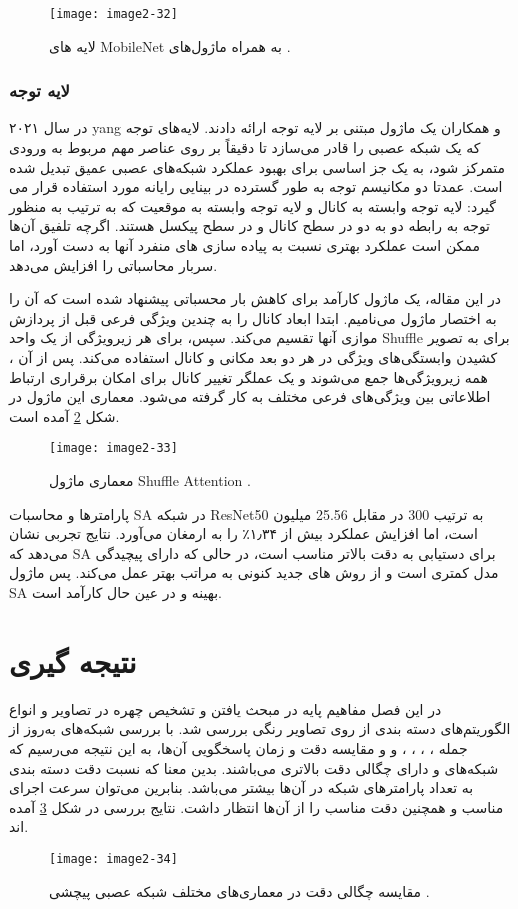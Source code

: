 \begin{figure}[h]
\centering
  \texttt{[image: image2-32]}
  \caption{
لایه های MobileNet به همراه ماژول‌های 
   \cite{yang2021sanet}.}
  \label{image2-32}
\end{figure}

\subsubsection{لایه توجه}
در سال ۲۰۲۱ yang و همکاران \cite{yang2021sanet} یک ماژول مبتنی بر لایه توجه ارائه دادند. لایه‌های توجه که یک شبکه عصبی را قادر می‌سازد تا دقیقاً بر روی عناصر مهم مربوط به ورودی متمرکز شود، به یک جز اساسی برای بهبود عملکرد شبکه‌های عصبی عمیق تبدیل شده است. عمدتا دو مکانیسم توجه به طور گسترده در بینایی رایانه مورد استفاده قرار می گیرد: لایه توجه وابسته به كانال  و لایه توجه وابسته به موقعيت  که به ترتیب به منظور توجه به رابطه دو به دو در سطح کانال و در سطح پیکسل هستند. اگرچه تلفیق آن‌ها ممکن است عملکرد بهتری نسبت به پیاده سازی های منفرد آنها به دست آورد‌، اما سربار محاسباتی را افزایش می‌دهد.

\noindent
در این مقاله، یک ماژول  کارآمد برای کاهش بار محسباتی پیشنهاد شده است که آن را به اختصار ماژول  می‌نامیم. ابتدا ابعاد کانال را به چندین ویژگی فرعی قبل از پردازش موازی آنها تقسیم می‌کند. سپس، برای هر زیر‌ویژگی از یک واحد Shuffle برای به تصویر کشیدن وابستگی‌های ویژگی در هر دو بعد مکانی و کانال استفاده می‌کند. پس از آن ، همه زیر‌ویژگی‌ها جمع می‌شوند و یک عملگر تغییر کانال برای امکان برقراری ارتباط اطلاعاتی بین ویژگی‌های فرعی مختلف به کار گرفته می‌شود. معماری این ماژول در شکل \ref{image2-33} آمده است.

\begin{figure}[h]
\centering
  \texttt{[image: image2-33]}
  \caption{
  معماری ماژول Shuffle Attention
   \cite{yang2021sanet}.}
  \label{image2-33}
\end{figure}

\noindent
پارامترها و محاسبات SA در شبکه ResNet50 به ترتیب 300 در مقابل 25.56 میلیون است، اما افزایش عملکرد بیش از ۱٫۳۴٪ را به ارمغان می‌آورد. نتایج تجربی نشان می‌دهد که SA برای دستیابی به دقت بالاتر مناسب است، در حالی که دارای پیچیدگی مدل کمتری است و از روش های جدید  کنونی به مراتب بهتر عمل می‌کند. پس ماژول SA بهینه و در عین حال کارآمد است.

\section{نتیجه گیری}
در این فصل مفاهیم‌ پایه در مبحث یافتن و تشخیص چهره در تصاویر و انواع الگوریتم‌های دسته ‌بندی از روی تصاویر رنگی بررسی شد. با بررسی شبکه‌های به‌روز از جمله
 ،
 ،
 ،
 ،
و
و مقایسه دقت و زمان پاسخگویی آن‌ها، به این نتیجه می‌رسیم که شبکه‌های  و  دارای چگالی دقت بالاتری می‌باشند. بدین معنا که نسبت دقت دسته بندی به تعداد پارامترهای شبکه در آن‌ها بیشتر می‌باشد. بنابرین می‌توان سرعت اجرای مناسب و همچنین دقت مناسب را از آن‌ها انتظار داشت. نتایج بررسی در شکل \ref{image2-34} آمده اند.

\begin{figure}[h]
\centering
  \texttt{[image: image2-34]}
  \caption{
  مقایسه چگالی دقت در معماری‌های مختلف شبکه عصبی پیچشی 
   \cite{Bianco_2018}.}
  \label{image2-34}
\end{figure}
